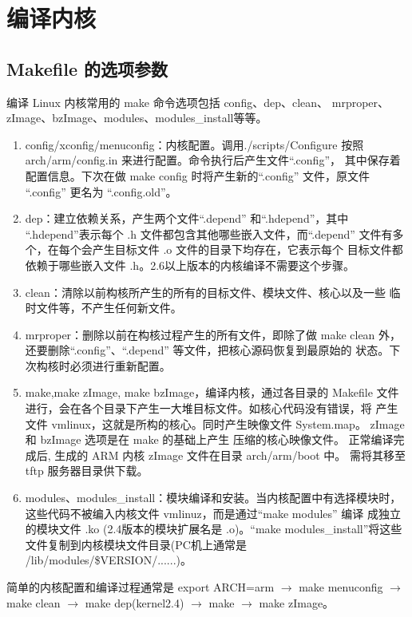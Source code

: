 \section{编译内核}
\subsection{Makefile 的选项参数}
	编译 Linux 内核常用的 make 命令选项包括 config、dep、clean、
mrproper、zImage、bzImage、modules、modules\_install等等。
\begin{enumerate}\itemsep=-3pt
  \item config/xconfig/menuconfig：内核配置。调用./scripts/Configure 按照
		arch/arm/config.in 来进行配置。命令执行后产生文件``.config''，
		其中保存着配置信息。下次在做 make config 时将产生新的``.config''
		文件，原文件 ``.config'' 更名为 ``.config.old''。
  \item dep：建立依赖关系，产生两个文件``.depend'' 和``.hdepend''，其中
		``.hdepend''表示每个 .h 文件都包含其他哪些嵌入文件，而``.depend''
		文件有多个，在每个会产生目标文件 .o 文件的目录下均存在，它表示每个
		目标文件都依赖于哪些嵌入文件 .h。2.6以上版本的内核编译不需要这个步骤。
  \item clean：清除以前构核所产生的所有的目标文件、模块文件、核心以及一些
		临时文件等，不产生任何新文件。
  \item mrproper：删除以前在构核过程产生的所有文件，即除了做 make clean 外，
		还要删除``.config''、``.depend'' 等文件，把核心源码恢复到最原始的
		状态。下次构核时必须进行重新配置。
  \item make,make zImage, make bzImage，编译内核，通过各目录的 Makefile
		文件进行，会在各个目录下产生一大堆目标文件。如核心代码没有错误，将
		产生文件 vmlinux，这就是所构的核心。同时产生映像文件 System.map。
		zImage 和 bzImage 选项是在 make 的基础上产生 压缩的核心映像文件。
		正常编译完成后, 生成的 ARM 内核 zImage 文件在目录 arch/arm/boot 中。
		需将其移至 tftp 服务器目录供下载。
  \item modules、modules\_install：模块编译和安装。当内核配置中有选择模块时，
		这些代码不被编入内核文件 vmlinuz，而是通过``make modules'' 编译
		成独立的模块文件 .ko (2.4版本的模块扩展名是 .o)。``make
		modules\_install''将这些文件复制到内核模块文件目录(PC机上通常是
		/lib/modules/\$VERSION/......)。
\end{enumerate}

	简单的内核配置和编译过程通常是 export ARCH=arm $\to$ make menuconfig
	$\to$ make clean $\to$ make dep(kernel2.4) $\to$ make $\to$
	make zImage。

